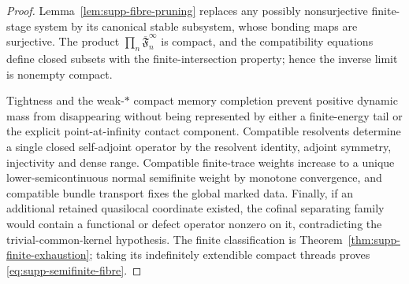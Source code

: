 \documentclass[11pt]{article}
\theoremstyle{definition}
\theoremstyle{remark}
\theoremstyle{definition}
\theoremstyle{remark}
\begin{document}
\begin{proof}
Lemma~\ref{lem:supp-fibre-pruning} replaces any possibly nonsurjective finite-stage
system by its canonical stable subsystem, whose bonding maps are surjective.  The
product $\prod_n\overline{\mathfrak F}_n^\infty$ is compact, and the compatibility
equations define closed subsets with the finite-intersection property; hence the
inverse limit is nonempty compact.

Tightness and the weak-$*$ compact memory completion prevent positive dynamic mass
from disappearing without being represented by either a finite-energy tail or the
explicit point-at-infinity contact component.  Compatible resolvents determine a
single closed self-adjoint operator by the resolvent identity, adjoint symmetry,
injectivity and dense range.  Compatible finite-trace weights increase to a unique
lower-semicontinuous normal semifinite weight by monotone convergence, and
compatible bundle transport fixes the global marked data.  Finally, if an
additional retained quasilocal coordinate existed, the cofinal separating family
would contain a functional or defect operator nonzero on it, contradicting the
trivial-common-kernel hypothesis.  The finite classification is
Theorem~\ref{thm:supp-finite-exhaustion}; taking its indefinitely extendible compact
threads proves \eqref{eq:supp-semifinite-fibre}.
\end{proof}
\end{document}
